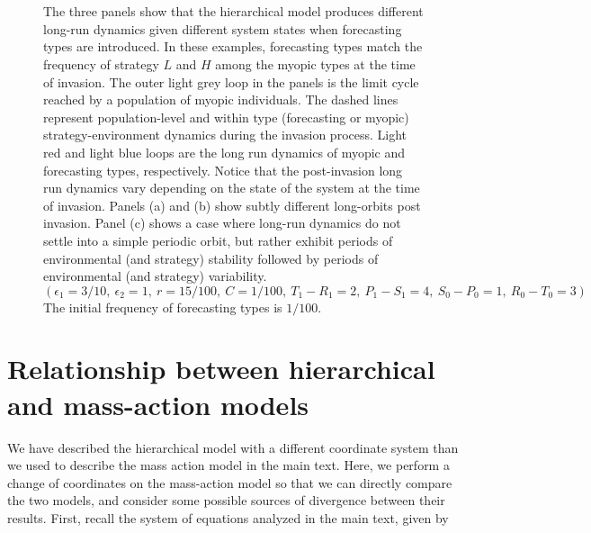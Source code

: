 \documentclass{article}
\begin{document}
\begin{figure}
\centering
\hspace{0mm}\vspace{0mm}
\\
\\
\caption{The three panels show that the hierarchical model produces different long-run dynamics given different system states when forecasting types are introduced. In these examples, forecasting types match the frequency of strategy $L$ and $H$ among the myopic types at the time of invasion. The outer light grey loop in the panels is the limit cycle reached by a population of myopic individuals. The dashed lines represent population-level and within type (forecasting or myopic) strategy-environment dynamics during the invasion process. Light red and light blue loops are the long run dynamics of myopic and forecasting types, respectively. Notice that the post-invasion long run dynamics vary depending on the state of the system at the time of invasion. Panels (a) and (b) show subtly different long-orbits post invasion. Panel (c) shows a case where long-run dynamics do not settle into a simple periodic orbit, but rather exhibit periods of environmental (and strategy) stability followed by periods of environmental (and strategy) variability.  
$\left(\epsilon_1=3/10,~ \epsilon_2=1,~ r=15/100,~ C=1/100,~ T_1-R_1=2,~ P_1-S_1=4,~ S_0-P_0=1,~ R_0-T_0=3\right)$ The initial frequency of forecasting types is $1/100$.}

\label{inv_timing}

\end{figure}


\section{Relationship between hierarchical and mass-action models}
We have described the hierarchical model with a different coordinate system than we used to describe the mass action model in the main text. Here, we perform a change of coordinates on the mass-action model so that we can directly compare the two models, and consider some possible sources of divergence between their results. First, recall the system of equations analyzed in the main text, given by
\end{document}
